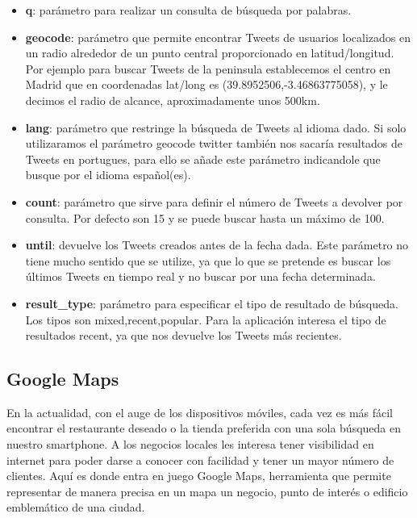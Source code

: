 \begin{itemize}

\item \textbf{q}: parámetro para realizar un consulta de búsqueda por palabras.

\item \textbf{geocode}: parámetro que permite encontrar Tweets de usuarios localizados en un radio alrededor de un punto central proporcionado en latitud/longitud. Por ejemplo para buscar Tweets de la peninsula establecemos el centro en Madrid que en coordenadas lat/long es (39.8952506,-3.46863775058), y le decimos el radio de alcance, aproximadamente unos  500km.

\item \textbf{lang}: parámetro que restringe la búsqueda de Tweets al idioma dado. Si solo utilizaramos el parámetro geocode twitter también nos sacaría resultados de Tweets en portugues, para ello se añade este parámetro indicandole que busque por el idioma español(es).

\item \textbf{count}: parámetro que sirve para definir el número de Tweets a devolver por consulta. Por defecto son 15 y se puede buscar hasta un máximo de 100.


\item \textbf{until}: devuelve los Tweets creados antes de la fecha dada. Este parámetro no tiene mucho sentido que se utilize, ya que lo que se pretende es buscar los últimos Tweets en tiempo real y no buscar por una fecha determinada.

\item \textbf{result\_type}: parámetro para especificar el tipo de resultado de búsqueda. Los tipos son mixed,recent,popular. Para la aplicación interesa el tipo de resultados recent, ya que nos devuelve los Tweets más recientes. 

\end{itemize}


\subsection{Google Maps}

 En la actualidad, con el auge de los dispositivos móviles, cada vez es más fácil encontrar el restaurante deseado o la tienda preferida con una sola búsqueda en nuestro smartphone. A los negocios locales les interesa tener visibilidad en internet para poder darse a conocer con facilidad y tener un mayor número de clientes. Aquí es donde entra en juego Google Maps, herramienta que permite representar de manera precisa en un mapa un negocio, punto de interés o edificio emblemático de una ciudad.

